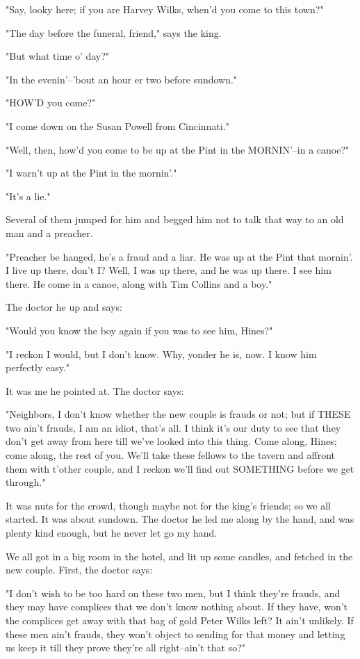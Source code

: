"Say, looky here; if you are Harvey Wilks, when'd you come to this town?"

"The day before the funeral, friend," says the king.

"But what time o' day?"

"In the evenin'--'bout an hour er two before sundown."

"HOW'D you come?"

"I come down on the Susan Powell from Cincinnati."

"Well, then, how'd you come to be up at the Pint in the MORNIN'--in a
canoe?"

"I warn't up at the Pint in the mornin'."

"It's a lie."

Several of them jumped for him and begged him not to talk that way to an
old man and a preacher.

"Preacher be hanged, he's a fraud and a liar.  He was up at the Pint that
mornin'.  I live up there, don't I?  Well, I was up there, and he was up
there.  I see him there.  He come in a canoe, along with Tim Collins and
a boy."

The doctor he up and says:

"Would you know the boy again if you was to see him, Hines?"

"I reckon I would, but I don't know.  Why, yonder he is, now.  I know him
perfectly easy."

It was me he pointed at.  The doctor says:

"Neighbors, I don't know whether the new couple is frauds or not; but if
THESE two ain't frauds, I am an idiot, that's all.  I think it's our duty
to see that they don't get away from here till we've looked into this
thing. Come along, Hines; come along, the rest of you.  We'll take these
fellows to the tavern and affront them with t'other couple, and I reckon
we'll find out SOMETHING before we get through."

It was nuts for the crowd, though maybe not for the king's friends; so we
all started.  It was about sundown.  The doctor he led me along by the
hand, and was plenty kind enough, but he never let go my hand.

We all got in a big room in the hotel, and lit up some candles, and
fetched in the new couple.  First, the doctor says:

"I don't wish to be too hard on these two men, but I think they're
frauds, and they may have complices that we don't know nothing about.  If
they have, won't the complices get away with that bag of gold Peter Wilks
left?  It ain't unlikely.  If these men ain't frauds, they won't object
to sending for that money and letting us keep it till they prove they're
all right--ain't that so?"

